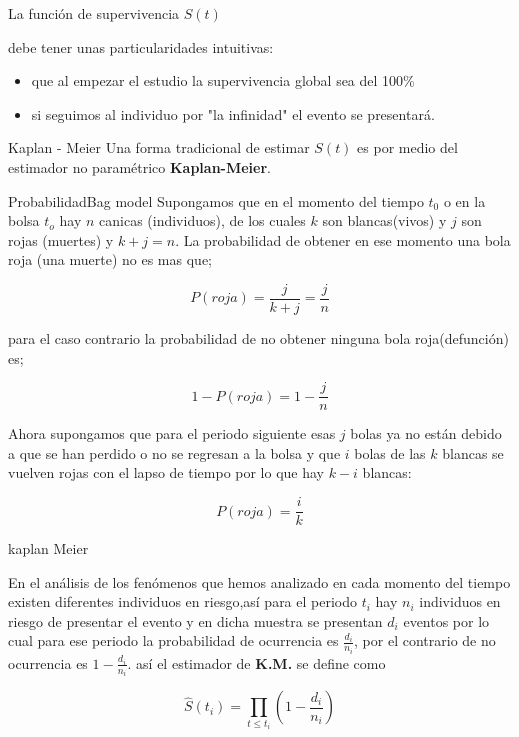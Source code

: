 \documentclass{beamer}
\begin{document}
\begin{frame}{La función de supervivencia $S(t)$}

debe tener unas particularidades intuitivas:

\begin{itemize}
\item que al empezar el estudio la supervivencia global sea del 100\%


\item si seguimos al individuo por "la infinidad" el evento se presentará.


\end{itemize}



\end{frame}






\begin{frame}{ Kaplan - Meier }
Una forma tradicional de estimar $S(t)$ es por medio del estimador no paramétrico \textbf{Kaplan-Meier}. 
\end{frame}

\begin{frame}{Probabilidad}{Bag model}
Supongamos que en el momento del tiempo $t_0$ o en la bolsa $t_o$ hay  $n$ canicas (individuos), de los cuales $k$ son blancas(vivos) y $j$ son rojas (muertes)  y  $k + j = n $. La probabilidad de obtener en ese momento una bola roja (una muerte) no es mas que;

$$ P(roja)= \frac{j}{k+j} = \frac{j}{n}$$

\end{frame}

\begin{frame}
para el caso contrario la probabilidad de no obtener ninguna bola roja(defunción) es;

$$1 -P(roja)= 1 - \dfrac{j}{n}$$

Ahora supongamos que para el periodo siguiente esas $j$ bolas ya no están debido a que se han perdido o no se regresan a la bolsa y que  $i$ bolas  de las $k$ blancas se vuelven rojas con el lapso de tiempo por lo que hay $k-i$ blancas:

$$P(roja)= \dfrac{i}{k}$$


\end{frame} 

\begin{frame}{kaplan Meier}

En el análisis de los fenómenos que hemos analizado en cada momento del tiempo existen diferentes individuos en riesgo,así para el periodo $t_i$ hay $n_i$ individuos en riesgo de presentar el evento y en dicha muestra se presentan $d_i$ eventos por lo cual para ese periodo la probabilidad de ocurrencia es $\frac{d_{i}}{n_{i}} $, por el contrario de no ocurrencia es $1- \frac{d_{i}}{n_{i}}$. así el estimador de \textbf{K.M.} se define como


$$ \hat{S}(t_{i})=\prod_{{t\leq}t_{i}} (1-\frac{d_{i}}{n_{i}})$$

\end{frame} 
\end{document}
